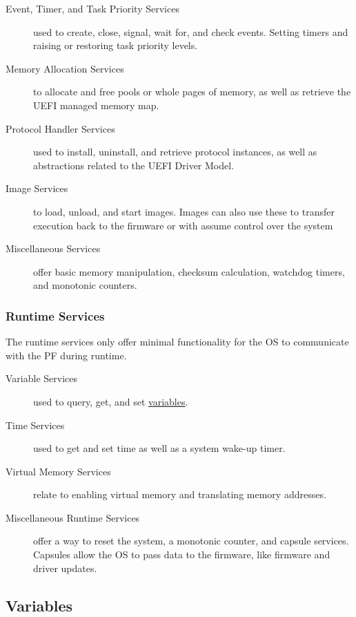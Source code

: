 \begin{description}
    \item [Event, Timer, and Task Priority Services] used to create, close, signal, wait for, and check events. Setting timers and raising or restoring task priority levels.
    \item [Memory Allocation Services] to allocate and free pools or whole pages of memory, as well as retrieve the \ac{UEFI} managed memory map.
    \item [Protocol Handler Services] used to install, uninstall, and retrieve protocol instances, as well as abstractions related to the \ac{UEFI} Driver Model.
    \item [Image Services] to load, unload, and start images. Images can also use these to transfer execution back to the firmware or with  assume control over the system
    \item [Miscellaneous Services] offer basic memory manipulation, checksum calculation, watchdog timers, and monotonic counters.
\end{description}

\subsubsection{Runtime Services}

The runtime services only offer minimal functionality for the \ac{OS} to communicate with the \ac{PF} during runtime.

\begin{description}
    \item [Variable Services] used to query, get, and set \hyperref[sec:uefi-pi:uefi:variables]{variables}.
    \item [Time Services] used to get and set time as well as a system wake-up timer.
    \item [Virtual Memory Services] relate to enabling virtual memory and translating memory addresses.
    \item [Miscellaneous Runtime Services] offer a way to reset the system, a monotonic counter, and capsule services.
          Capsules allow the \ac{OS} to pass data to the firmware, like firmware and driver updates.
\end{description}

\subsection{Variables}
\label{sec:uefi-pi:uefi:variables}

